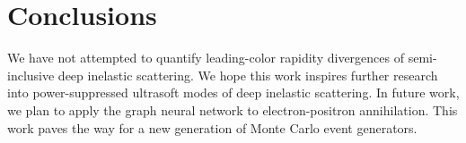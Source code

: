 \section{Conclusions}\label{sec:conclusions}

We have not attempted to quantify leading-color rapidity divergences of
semi-inclusive deep inelastic scattering. We hope this work inspires
further research into power-suppressed ultrasoft modes of deep inelastic
scattering. In future work, we plan to apply the graph neural network to
electron-positron annihilation. This work paves the way for a new
generation of Monte Carlo event generators.

